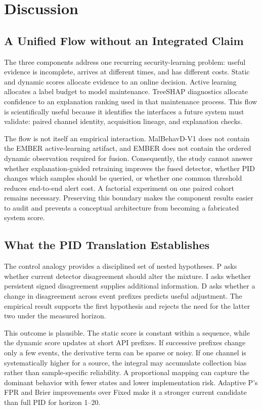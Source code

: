 \section{Discussion}
\label{sec:discussion}

\subsection{A Unified Flow without an Integrated Claim}

The three components address one recurring security-learning problem: useful
evidence is incomplete, arrives at different times, and has different costs.
Static and dynamic scores allocate evidence to an online decision. Active
learning allocates a label budget to model maintenance. TreeSHAP diagnostics
allocate confidence to an explanation ranking used in that maintenance process.
This flow is scientifically useful because it identifies the interfaces a future
system must validate: paired channel identity, acquisition lineage, and
explanation checks.

The flow is not itself an empirical interaction. MalBehavD-V1 does not contain
the EMBER active-learning artifact, and EMBER does not contain the ordered
dynamic observation required for fusion. Consequently, the study cannot answer
whether explanation-guided retraining improves the fused detector, whether PID
changes which samples should be queried, or whether one common threshold reduces
end-to-end alert cost. A factorial experiment on one paired cohort remains
necessary. Preserving this boundary makes the component results easier to audit
and prevents a conceptual architecture from becoming a fabricated system score.

\subsection{What the PID Translation Establishes}

The control analogy provides a disciplined set of nested hypotheses. P asks
whether current detector disagreement should alter the mixture. I asks whether
persistent signed disagreement supplies additional information. D asks whether a
change in disagreement across event prefixes predicts useful adjustment. The
empirical result supports the first hypothesis and rejects the need for the
latter two under the measured horizon.

This outcome is plausible. The static score is constant within a sequence, while
the dynamic score updates at short API prefixes. If successive prefixes change
only a few events, the derivative term can be sparse or noisy. If one channel is
systematically higher for a source, the integral may accumulate collection bias
rather than sample-specific reliability. A proportional mapping can capture the
dominant behavior with fewer states and lower implementation risk. Adaptive P's
FPR and Brier improvements over Fixed make it a stronger current candidate than
full PID for horizon 1--20.

